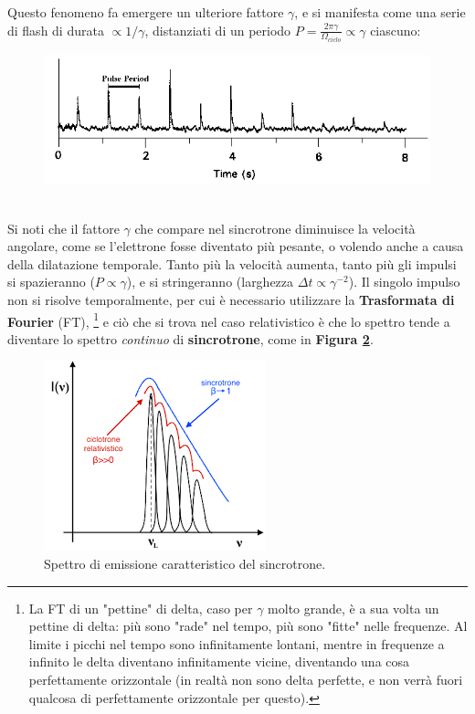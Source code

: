 Questo fenomeno fa emergere un ulteriore fattore $\gamma$, e si manifesta come una serie di flash di durata $\propto 1/\gamma$, distanziati di un periodo $P=\frac{2\pi\gamma}{\Omega_{ciclo}}\propto\gamma$ ciascuno:
\begin{figure}[h!]
    \centering
    \includegraphics[width=0.5\linewidth]{Immagini/pulsar pulses.png}
    \label{fig: pulsi pulsars}
\end{figure}\\
Si noti che il fattore $\gamma$ che compare nel sincrotrone diminuisce la velocità angolare, come se l'elettrone fosse diventato più pesante, o volendo anche a causa della dilatazione temporale.
Tanto più la velocità aumenta, tanto più gli impulsi si spazieranno ($P\propto\gamma$), e si stringeranno (larghezza $\Delta t\propto\gamma^{-2}$).
Il singolo impulso non si risolve temporalmente, per cui è necessario utilizzare la \textbf{Trasformata di Fourier} (FT),
\footnote{
La FT di un "pettine" di delta, caso per $\gamma$ molto grande, è a sua volta un pettine di delta: più sono "rade" nel tempo, più sono "fitte" nelle frequenze.
Al limite i picchi nel tempo sono infinitamente lontani, mentre in frequenze a infinito le delta diventano infinitamente vicine, diventando una cosa perfettamente orizzontale (in realtà non sono delta perfette, e non verrà fuori qualcosa di perfettamente orizzontale per questo).
}
e ciò che si trova nel caso relativistico è che lo spettro tende a diventare lo spettro \textit{continuo} di \textbf{sincrotrone}, come in \textbf{Figura \ref{fig: spettro di sincrotrone}}.
\begin{figure}[h!]
    \centering
    \includegraphics[width=0.4\linewidth]{Immagini/spettro sincrotrone.png}
    \caption{Spettro di emissione caratteristico del sincrotrone.}
    \label{fig: spettro di sincrotrone}
\end{figure}
